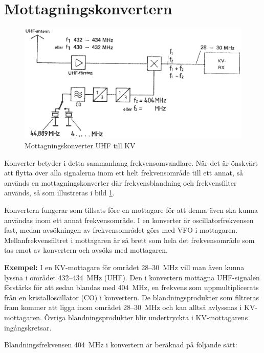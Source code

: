 \section{Mottagningskonvertern}

\begin{figure}
  \includegraphics[width=\textwidth]{images/cropped_pdfs/bild_2_4-18.pdf}
  \caption{Mottagningskonverter UHF till KV}
  \label{fig:bildII4-18}
\end{figure}

Konverter betyder i detta sammanhang frekvensomvandlare.
När det är önskvärt att flytta över alla signalerna inom ett helt frekvensområde
till ett annat, så används en mottagningskonverter där frekvensblandning och
frekvensfilter används, så som illustreras i bild \ref{fig:bildII4-18}.

Konvertern fungerar som tillsats före en mottagare för att denna även
ska kunna användas inom ett annat frekvensområde.
I en konverter är oscillatorfrekvensen fast, medan avsökningen av
frekvensområdet görs med VFO i mottagaren.
Mellanfrekvensfiltret i mottagaren är så brett som hela det frekvensområde
som tas emot av konvertern och avsöks med mottagaren.

\textbf{Exempel:}
I en KV-mottagare för området 28--30~MHz vill man även kunna lyssna i området
432--434~MHz (UHF).
Den i konvertern mottagna UHF-signalen förstärks för att sedan blandas med
404~MHz, en frekvens som uppmultiplicerats från en kristalloscillator (CO) i
konvertern.
De blandningsprodukter som filtreras fram kommer att ligga inom området
28--30~MHz och kan alltså avlyssnas i KV-mottagaren.
Övriga blandningsprodukter blir undertryckta i KV-mottagarens ingångskretsar.

Blandningsfrekvensen 404~MHz i konvertern är beräknad på följande sätt:

